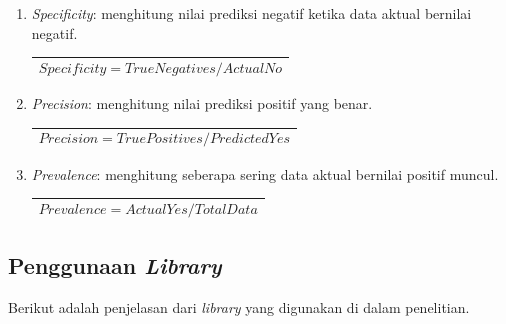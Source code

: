 \begin{enumerate}
	\item
	\textit{Specificity}: menghitung nilai prediksi negatif ketika data aktual bernilai negatif. 
	\begin{table}[H]
		\small
		\begin{adjustbox}{width=1\textwidth}
			\begin{tabular}{|p{13.55cm}|}
				\hline
				\begin{equation}
				Specificity=True Negatives/Actual No
				\end{equation}\\
				\hline
			\end{tabular}
		\end{adjustbox}
	\end{table}
	
	\item
	\textit{Precision}: menghitung nilai prediksi positif yang benar.
	\begin{table}[H]
		\small
		\begin{adjustbox}{width=1\textwidth}
			\begin{tabular}{|p{13.55cm}|}
				\hline
				\begin{equation}
				Precision=True Positives/Predicted  Yes
				\end{equation}\\
				\hline
			\end{tabular}
		\end{adjustbox}
	\end{table}	
	
	\item
	\textit{Prevalence}: menghitung seberapa sering data aktual bernilai positif muncul.
	\begin{table}[H]
		\small
		\begin{adjustbox}{width=1\textwidth}
			\begin{tabular}{|p{13.55cm}|}
				\hline
				\begin{equation}
				Prevalence=Actual Yes/TotalData
				\end{equation}\\
				\hline
			\end{tabular}
		\end{adjustbox}
	\end{table}
	
\end{enumerate}

\subsection{Penggunaan \textit{Library}}
Berikut adalah penjelasan dari \textit{library} yang digunakan di dalam penelitian. \\
